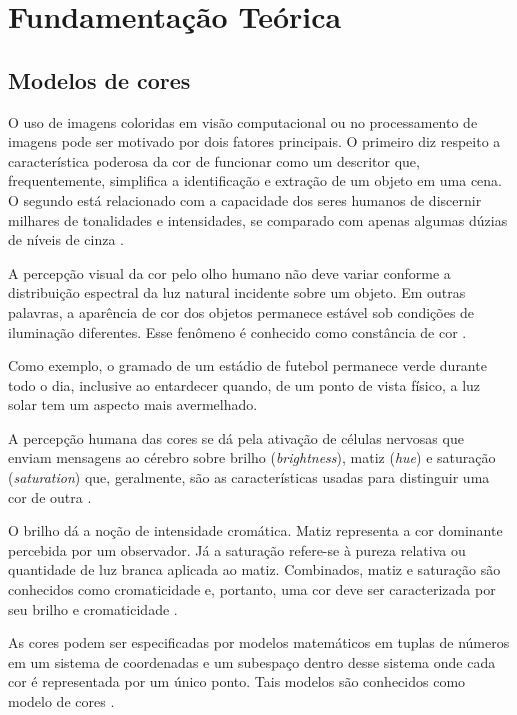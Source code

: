 \chapter{Fundamentação Teórica}
\label{cap:conceitos}

\section{Modelos de cores}
\label{sec:fundamentos}

O uso de imagens coloridas em visão computacional ou no processamento de imagens pode ser motivado por dois fatores principais. O primeiro diz respeito a característica poderosa da cor de funcionar como um descritor que, frequentemente, simplifica a identificação e extração de um objeto em uma cena. O segundo está relacionado com a capacidade dos seres humanos de discernir milhares de tonalidades e intensidades, se comparado com apenas algumas dúzias de níveis de cinza \citep{gonzalez:02}.

A percepção visual da cor pelo olho humano não deve variar conforme a distribuição espectral da luz natural incidente sobre um objeto. Em outras palavras, a aparência de cor dos objetos permanece estável sob condições de iluminação diferentes. Esse fenômeno é conhecido como constância de cor \citep{gevers:12}.

Como exemplo, o gramado de um estádio de futebol permanece verde durante todo o dia, inclusive ao entardecer quando, de um ponto de vista físico, a luz solar
tem um aspecto mais avermelhado.

A percepção humana das cores se dá pela ativação de células nervosas que enviam
mensagens ao cérebro sobre brilho (\textit{brightness}), matiz (\textit{hue}) e 
saturação (\textit{saturation}) que, geralmente, são as características usadas
para distinguir uma cor de outra \citep{gonzalez:02}.

O brilho dá a noção de intensidade cromática. Matiz representa a cor dominante
percebida por um observador. Já a saturação refere-se à pureza relativa ou quantidade de luz branca aplicada ao matiz. Combinados, matiz e saturação são conhecidos como cromaticidade e, portanto, uma cor deve ser caracterizada por seu brilho e cromaticidade \citep{gonzalez:02}.

As cores podem ser especificadas por modelos matemáticos em tuplas de números em um sistema de coordenadas e um subespaço dentro desse sistema onde cada cor
é representada por um único ponto. Tais modelos são conhecidos como modelo de cores \citep{gonzalez:02}.

